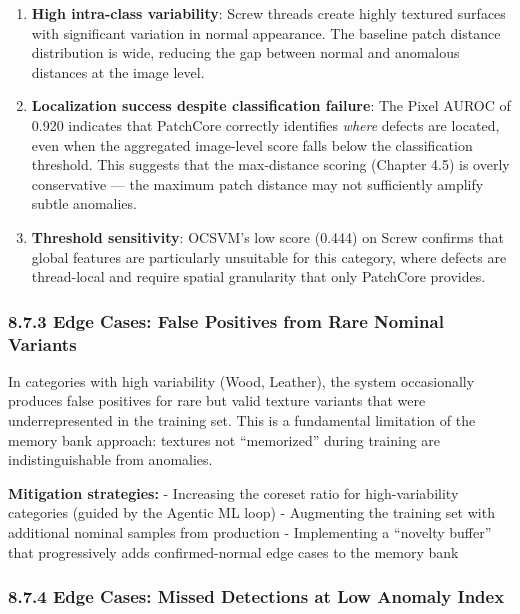 \begin{enumerate}
\def\labelenumi{\arabic{enumi}.}
\item
  \textbf{High intra-class variability}: Screw threads create highly textured surfaces with significant variation in normal appearance. The baseline patch distance distribution is wide, reducing the gap between normal and anomalous distances at the image level.
\item
  \textbf{Localization success despite classification failure}: The Pixel AUROC of 0.920 indicates that PatchCore correctly identifies \emph{where} defects are located, even when the aggregated image-level score falls below the classification threshold. This suggests that the max-distance scoring (Chapter 4.5) is overly conservative --- the maximum patch distance may not sufficiently amplify subtle anomalies.
\item
  \textbf{Threshold sensitivity}: OCSVM's low score (0.444) on Screw confirms that global features are particularly unsuitable for this category, where defects are thread-local and require spatial granularity that only PatchCore provides.
\end{enumerate}

\subsubsection{8.7.3 Edge Cases: False Positives from Rare Nominal Variants}\label{edge-cases-false-positives-from-rare-nominal-variants}

In categories with high variability (Wood, Leather), the system occasionally produces false positives for rare but valid texture variants that were underrepresented in the training set. This is a fundamental limitation of the memory bank approach: textures not ``memorized'' during training are indistinguishable from anomalies.

\textbf{Mitigation strategies:} - Increasing the coreset ratio for high-variability categories (guided by the Agentic ML loop) - Augmenting the training set with additional nominal samples from production - Implementing a ``novelty buffer'' that progressively adds confirmed-normal edge cases to the memory bank

\subsubsection{8.7.4 Edge Cases: Missed Detections at Low Anomaly Index}\label{edge-cases-missed-detections-at-low-anomaly-index}

